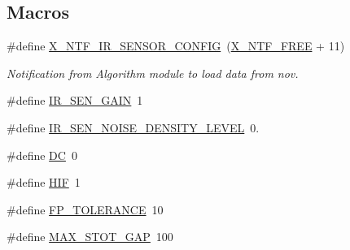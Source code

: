 \subsection*{Macros}
\begin{DoxyCompactItemize}
\item 
\#define \hyperlink{a00017_abb12b7d6a5f3479f552b928bb008d7cd}{X\+\_\+\+N\+T\+F\+\_\+\+I\+R\+\_\+\+S\+E\+N\+S\+O\+R\+\_\+\+C\+O\+N\+F\+I\+G}~(\hyperlink{a00036_ab2eeea4643823a0c7c7731ddb83e3edc}{X\+\_\+\+N\+T\+F\+\_\+\+F\+R\+E\+E} + 11)
\begin{DoxyCompactList}\small\item\em Notification from Algorithm module to load data from nov. \end{DoxyCompactList}\item 
\#define \hyperlink{a00017_af338b9b2d1e427c363ae2dfb091b94b0}{I\+R\+\_\+\+S\+E\+N\+\_\+\+G\+A\+I\+N}~1
\item 
\#define \hyperlink{a00017_a2b2ec7850b6e5f2ba35f81301fc797dd}{I\+R\+\_\+\+S\+E\+N\+\_\+\+N\+O\+I\+S\+E\+\_\+\+D\+E\+N\+S\+I\+T\+Y\+\_\+\+L\+E\+V\+E\+L}~0.
\item 
\#define \hyperlink{a00017_a0caba21dab832e280875be65012b30fc}{D\+C}~0
\item 
\#define \hyperlink{a00017_aaa1c1ffe30eff38b979b1af9d4e4ef19}{H\+I\+F}~1
\item 
\#define \hyperlink{a00017_a946f0acff4fd16a65859479e9e0b9513}{F\+P\+\_\+\+T\+O\+L\+E\+R\+A\+N\+C\+E}~10
\item 
\#define \hyperlink{a00017_aec8939cfd4ea8a0119ec02a358811b17}{M\+A\+X\+\_\+\+S\+T\+O\+T\+\_\+\+G\+A\+P}~100
\end{DoxyCompactItemize}
